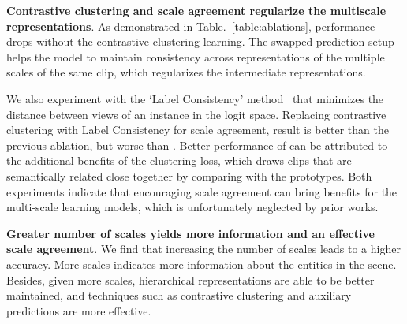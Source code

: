 \documentclass[runningheads]{llncs}
\begin{document}
 
\noindent \textbf{Contrastive clustering and scale agreement regularize the multiscale representations}. 
As demonstrated in Table.~\ref{table:ablations}, performance drops without the contrastive clustering learning. 
The swapped prediction setup 
helps the model to maintain consistency across representations of the multiple scales of the same clip, which regularizes the intermediate representations.



We also experiment with the `Label Consistency' method~\cite{shi2020online} that minimizes the  distance between  views of an instance in the logit space. Replacing contrastive clustering 
with Label Consistency for scale agreement,  result is better than the previous ablation, but worse than \ourseos. 
Better performance of \ours can be attributed to the additional benefits of the clustering loss, which draws clips that are semantically related close together by comparing with the prototypes. Both experiments indicate that 
encouraging scale agreement can bring benefits for the multi-scale  
learning models, which is unfortunately neglected by prior works. 


\noindent \textbf{Greater number of scales 
yields more information and an effective scale agreement}.  
We find that increasing the number of  
scales leads to a higher accuracy.  
More scales indicates more information about the entities in the scene. 
Besides, 
given more scales, hierarchical representations are able to be better maintained, and techniques such as contrastive clustering and auxiliary predictions are 
more 
effective. 
\end{document}
